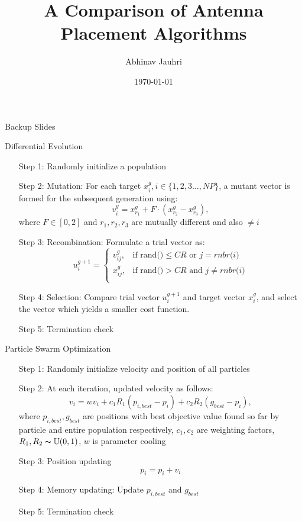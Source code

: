 \documentclass{beamer}
\title{\color{univred} A Comparison of Antenna Placement Algorithms}
\author{Abhinav Jauhri}
\date{\today}
\begin{document}
\begin{frame}
    \color{univred}
    \titlepage
    \begin{center}
        {\tiny Backup Slides}
\end{center}
\end{frame}

\begin{frame}{Differential Evolution}
    \begin{enumerate}
        \item [Step 1:] Randomly initialize a population 
        \item [Step 2:] Mutation: For each target $x_i^g, i \in \{1, 2, 3 \ldots, NP\}$, a mutant vector is formed for the subsequent generation using:
            \[v_i^{g} = x_{r_1}^g + F \cdot (x_{r_2}^g - x_{r_3}^g), \]
            where $F \in [0,2]$ and $r_1, r_2, r_3$ are mutually different and also $ \neq i$
        \item [Step 3:] Recombination: Formulate a trial vector as:
    \[u_i^{g+1} = 
        \begin{cases}
            v_{ij}^g, & \text{if rand()} \leq CR \text{ or }j = \textit{rnbr(i)} \\
            x_{ij}^g, & \text{if rand()} > CR \text{ and }j \neq \textit{rnbr(i)} \\
    \end{cases}\]
        \item [Step 4:] Selection: Compare trial vector $u_i^{g+1}$ and target vector $x_i^g$, and select the vector which yields a smaller cost function.\\
        \item [Step 5:] Termination check
    \end{enumerate}
\end{frame}


\begin{frame}{Particle Swarm Optimization}
    \begin{enumerate}
        \item [Step 1:] Randomly initialize velocity and position of all particles
        \item [Step 2:] At each iteration, updated velocity as follows:
            \[ v_i = wv_i + c_1 R_1 (p_{i,best} - p_i) + c_2 R_2 (g_{best} - p_i) ,\]
            where $p_{i,best}, g_{best}$ are positions with best objective value found so far by particle and entire population respectively, $c_1,c_2$ are weighting factors, $R_1,R_2 \thicksim \mathbb U(0,1)$, $w$ is parameter cooling
        \item [Step 3:] Position updating
            \[ p_i = p_i + v_i \]
        \item [Step 4:] Memory updating: Update $p_{i,best}$ and $g_{best}$
        \item [Step 5:] Termination check
    \end{enumerate}
\end{frame}
\end{document}
